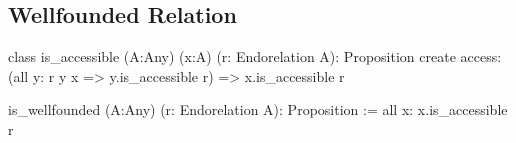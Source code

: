 \subsection{Wellfounded Relation}

\begin{alba}
  class
    is_accessible (A:Any) (x:A) (r: Endorelation A): Proposition
  create
    access: (all y: r y x => y.is_accessible r) => x.is_accessible r

  is_wellfounded (A:Any) (r: Endorelation A): Proposition
    := all x: x.is_accessible r
\end{alba}


